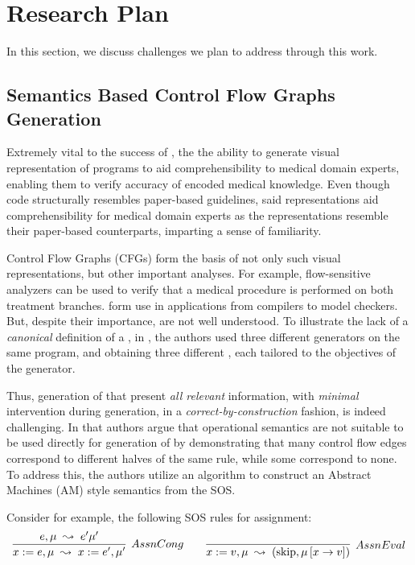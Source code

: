 \section{Research Plan}

In this section, we discuss challenges we plan to address through this work.

\subsection{Semantics Based Control Flow Graphs Generation}

Extremely vital to the success of \MediK{}, the the ability
to generate visual representation of \MediK{} programs to aid
comprehensibility to medical domain experts, enabling them to verify
accuracy of encoded medical knowledge. Even though \MediK{} code
structurally resembles paper-based guidelines, said
representations aid comprehensibility for medical
domain experts as the representations resemble their paper-based counterparts,
imparting a sense of familiarity.

Control Flow Graphs (CFGs) form the basis of not only such visual
representations, but other important analyses. For example,
flow-sensitive analyzers can be used to verify that a medical procedure
is performed on both treatment branches.
\CGSs{} form use in applications from compilers to model checkers.
But, despite their importance, \CGSs{} are not well understood.
To illustrate the lack of a \emph{canonical} definition of a \CGS{},
in \cite{KoppelICFP22}, the authors
used three different \CFG{} generators
on the same program, and obtaining three different \CFGs{}, each
tailored to the objectives of the generator.

Thus, generation of \CFGs{} that present \emph{all relevant} information,
with \emph{minimal} intervention during generation, in a
\emph{correct-by-construction} fashion, is indeed challenging.
In \cite{KoppelICFP22} that authors argue that operational semantics
are not suitable to be used directly for generation of \CFGs{} by demonstrating
that many control flow edges correspond to different halves of the same rule,
while some correspond to none. To address this, the authors utilize an algorithm
to construct an Abstract Machines (AM) style semantics from the SOS.

Consider for example, the following SOS rules for assignment:
$$
\infer[AssnCong]
{x := e, \mu\; \leadsto\; x := e^{\prime}, \mu^{\prime}}{e, \mu\; \leadsto\; e^{\prime}\mu^{\prime}}
\quad \quad
\infer[AssnEval]
{x := v,\mu\; \leadsto\; \left(\text{skip}, \mu\left[x \rightarrow v\right]\right)}{}
$$

